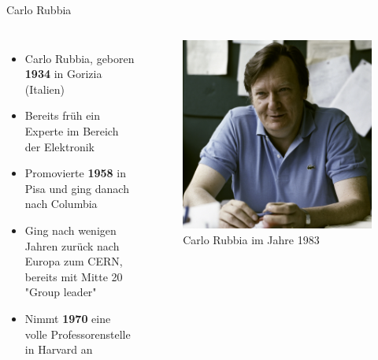 \documentclass[aspectratio=1610, professionalfonts, 10pt]{beamer}
\begin{document}
\begin{frame}{Carlo Rubbia}
	\begin{columns}
				\begin{itemize}
					\setlength\itemsep{0.5em}
					\item Carlo Rubbia, geboren \textbf{1934} in Gorizia (Italien)
					\item Bereits früh ein Experte im Bereich der Elektronik
					\item Promovierte \textbf{1958} in Pisa und ging danach nach Columbia
					\item Ging nach wenigen Jahren zurück nach Europa zum CERN, bereits mit Mitte 20 "Group leader"
					\item Nimmt \textbf{1970} eine volle Professorenstelle in Harvard an
				\end{itemize}

			\begin{figure}
	  			\centering
				\includegraphics[width=\linewidth]{Images/8308555X.jpg}
	  			\caption{Carlo Rubbia im Jahre 1983 \cite{CERN-PHOTO-8308555}}
	  			\label{fig:feynman}
			\end{figure}
	\end{columns}
\end{frame}
\end{document}
